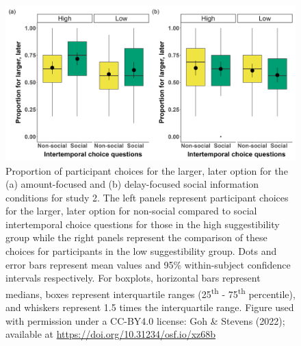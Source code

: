\documentclass[
  doc,floatsintext]{apa6}
\begin{document}
\begin{figure}

{\centering \includegraphics[width=1\linewidth]{figures/suggestibility_itc_2} 

}

\caption{Proportion of participant choices for the larger, later option for the (a) amount-focused and (b) delay-focused social information conditions for study 2. The left panels represent participant choices for the larger, later option for non-social compared to social intertemporal choice questions for those in the high suggestibility group while the right panels represent the comparison of these choices for participants in the low suggestibility group. Dots and error bars represent mean values and 95\% within-subject confidence intervals respectively. For boxplots, horizontal bars represent medians, boxes represent interquartile ranges (25\textsuperscript{th} - 75\textsuperscript{th} percentile), and whiskers represent 1.5 times the interquartile range. Figure used with permission under a CC-BY4.0 license: Goh \& Stevens (2022); available at \url{https://doi.org/10.31234/osf.io/xz68b}}\label{fig:suggestibility2}
\end{figure}
\end{document}
